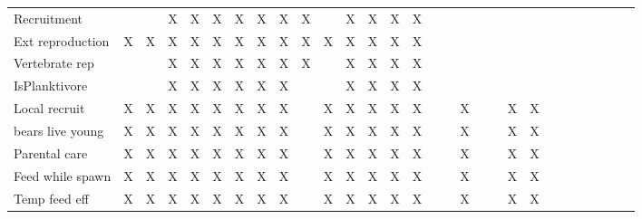 \documentclass[11pt]{article}
\begin{document}
\begin{center}
\begin{tabular}{lllllllllllllllllllllllllllll}
\hline
 Recruitment         &       &       &  X    &  X    &  X    &  X    &  X    &  X    &  X    &       &  X    &  X    &  X    &  X    &       &       &       &       &       &       &       &      &      &       &       &      &      &      \\
 Ext reproduction    &  X    &  X    &  X    &  X    &  X    &  X    &  X    &  X    &  X    &  X    &  X    &  X    &  X    &  X    &       &       &       &       &       &       &       &      &      &       &       &      &      &      \\
 Vertebrate rep      &       &       &  X    &  X    &  X    &  X    &  X    &  X    &  X    &       &  X    &  X    &  X    &  X    &       &       &       &       &       &       &       &      &      &       &       &      &      &      \\
 IsPlanktivore       &       &       &  X    &  X    &  X    &  X    &  X    &  X    &       &       &  X    &  X    &  X    &  X    &       &       &       &       &       &       &       &      &      &       &       &      &      &      \\
 Local recruit       &  X    &  X    &  X    &  X    &  X    &  X    &  X    &  X    &       &  X    &  X    &  X    &  X    &  X    &       &       &  X    &       &       &  X    &  X    &      &      &       &       &      &      &      \\
 bears live young    &  X    &  X    &  X    &  X    &  X    &  X    &  X    &  X    &       &  X    &  X    &  X    &  X    &  X    &       &       &  X    &       &       &  X    &  X    &      &      &       &       &      &      &      \\
 Parental care       &  X    &  X    &  X    &  X    &  X    &  X    &  X    &  X    &       &  X    &  X    &  X    &  X    &  X    &       &       &  X    &       &       &  X    &  X    &      &      &       &       &      &      &      \\
 Feed while spawn    &  X    &  X    &  X    &  X    &  X    &  X    &  X    &  X    &       &  X    &  X    &  X    &  X    &  X    &       &       &  X    &       &       &  X    &  X    &      &      &       &       &      &      &      \\
 Temp feed eff       &  X    &  X    &  X    &  X    &  X    &  X    &  X    &  X    &       &  X    &  X    &  X    &  X    &  X    &       &       &  X    &       &       &  X    &  X    &      &      &       &       &      &      &      \\

\end{tabular}
\end{center}
\end{document}
